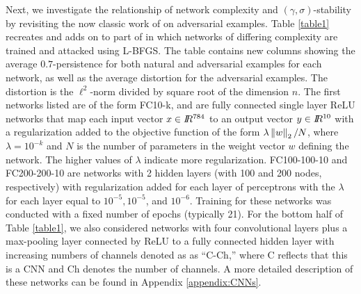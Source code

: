 Next, we investigate the relationship of network complexity and $(\gamma,\sigma)$-stability by revisiting the now classic work of \citet{Szegedy2013} on adversarial examples. 
%
Table \ref{table1} recreates and adds on to part of \cite[Table 1]{Szegedy2013} in which networks of differing complexity are trained and attacked using L-BFGS. The table contains new columns showing the average $0.7$-persistence for both natural and adversarial examples for each network, as well as the average distortion for the adversarial examples. The distortion is the $\ell^2$-norm divided by square root of the dimension $n$. The first networks listed are of the form FC10-k, and are fully connected single layer ReLU networks that map each input vector $x \in I\!\!R^{784}$ to an output vector $y \in I\!\!R^{10}$ with a regularization added to the objective function of the form $\lambda\left\Vert w \right\Vert_2/N$, where $\lambda = 10^{-k}$ and $N$ is the number of parameters in the weight vector $w$ defining the network. The higher values of $\lambda$ indicate more regularization.  
FC100-100-10 and FC200-200-10 are networks with 2 hidden layers (with 100 and 200 nodes, respectively) with regularization added for each layer of perceptrons with the $\lambda$ for each layer equal to $10^{-5}, 10^{-5}$, and  $10^{-6}$. Training for these networks was conducted with a fixed number of epochs (typically 21). For the bottom half of Table \ref{table1}, we also considered networks with four convolutional layers plus a max-pooling layer connected by ReLU to a fully connected hidden layer with increasing numbers of channels denoted as as ``C-Ch,'' where C reflects that this is a CNN and Ch denotes the number of channels. A more detailed description of these networks can be found in Appendix \ref{appendix:CNNs}.

